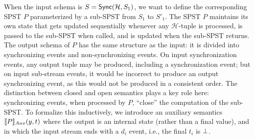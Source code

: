 When the input schema is $S=\hier{\mathcal{H}}{S_1}$, we want to
define the corresponding SPST $P$ parameterized by a sub-SPST from
$S_1$ to $S'_1$.
The SPST $P$ maintains its own state that gets updated sequentially
whenever any $\mathcal{H}$-tuple is processed,
is passed to the sub-SPST when called, and is updated when the sub-SPST returns.
The output schema of $P$ has the same structure as the input:
it is divided into synchronizing events and non-synchronizing events.
On input synchronization events, any output tuple may be produced,
including a synchronization event; but on input sub-stream events, it would be incorrect
to produce an output synchronizing event, as this would not be produced in a consistent order.
The distinction between closed and open
semantics plays a key role here:
synchronizing events, when processed by $P$, ``close'' the computation of the sub-SPST.
To formalize this inductively,
we introduce an auxiliary semantics $\spstsemI{y}{t}{P}$
where the output is an internal state (rather than a final value),
and in which the input stream ends with a $d_i$ event,
i.e., the final $t_i$ is $\spsemp{}$.

